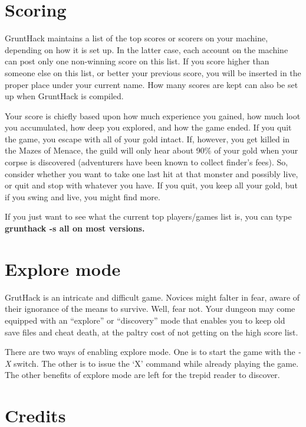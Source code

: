 \section{Scoring}

GruntHack maintains a list of the top scores or scorers on your machine,
depending on how it is set up.  In the latter case, each account on
the machine can post only one non-winning score on this list.  If
you score higher than someone else on this list, or better your
previous score, you will be inserted in the proper place under your
current name.  How many scores are kept can also be set up when
GruntHack is compiled.

Your score is chiefly based upon how much experience you gained, how
much loot you accumulated, how deep you explored, and how the game
ended.  If you quit the game, you escape with all of your gold intact.
If, however, you get killed in the Mazes of Menace, the guild will
only hear about 90\% of your gold when your corpse is discovered
(adventurers have been known to collect finder's fees).  So, consider
whether you want to take one last hit at that monster and possibly
live, or quit and stop with whatever you have.  If you quit, you keep
all your gold, but if you swing and live, you might find more.

If you just want to see what the current top players/games list is, you
can type %
\bf grunthack -s all \rm%
on most versions.

\section{Explore mode}

GrutHack is an intricate and difficult game.  Novices might falter
in fear, aware of their ignorance of the means to survive.  Well, fear
not.  Your dungeon may come equipped with an ``explore'' or ``discovery''
mode that enables you to keep old save files and cheat death, at the
paltry cost of not getting on the high score list.

There are two ways of enabling explore mode.  One is to start the game
with the
{\it -X }
switch.  The other is to issue the `X' command while already playing
the game.  The other benefits of explore mode are left for the trepid
reader to discover.

\section{Credits}

